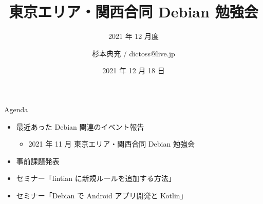 \title{東京エリア・関西合同 Debian 勉強会}
\subtitle{2021 年 12 月度} %
\author{杉本典充 / dictoss@live.jp}
\date{2021 年 12 月 18 日}



\begin{frame}
\titlepage{}
\end{frame}


\begin{frame}{Agenda}
 \begin{minipage}[t]{0.45\hsize}
  \begin{itemize}
  \item 最近あった Debian 関連のイベント報告
    \begin{itemize}
    \item 2021 年 11 月 東京エリア・関西合同 Debian 勉強会
    \end{itemize}
  \item 事前課題発表
  \end{itemize}
 \end{minipage}
 \begin{minipage}[t]{0.45\hsize}
   \begin{itemize}
   \item セミナー「lintian に新規ルールを追加する方法」
   \item セミナー「Debian で Android アプリ開発と Kotlin」
  \end{itemize}
 \end{minipage}
\end{frame}

